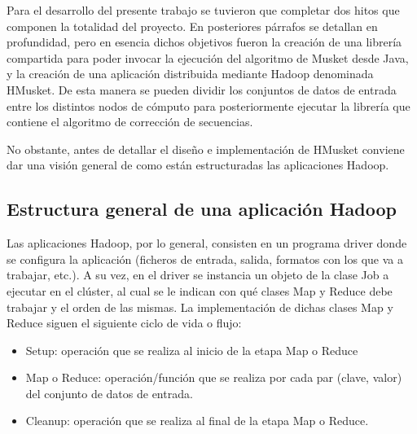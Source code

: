 \documentclass[conference]{IEEEtran}
\begin{document}
Para el desarrollo del presente trabajo se tuvieron que completar dos hitos que componen la totalidad del proyecto. En posteriores párrafos se detallan en profundidad, pero en esencia dichos objetivos fueron la creación de una librería compartida para poder invocar la ejecución del algoritmo de Musket desde Java, y la creación de una aplicación distribuida mediante Hadoop denominada HMusket. De esta manera se pueden dividir los conjuntos de datos de entrada entre los distintos nodos de cómputo para posteriormente ejecutar la librería que contiene el algoritmo de corrección de secuencias.

No obstante, antes de detallar el diseño e implementación de HMusket conviene dar una visión general de como están estructuradas las aplicaciones Hadoop.

\subsection{Estructura general de una aplicación Hadoop}
Las aplicaciones Hadoop, por lo general, consisten en un programa driver donde se configura la aplicación (ficheros de entrada, salida, formatos con los que va a trabajar, etc.). A su vez, en el driver se instancia un objeto de la clase Job a ejecutar en el clúster, al cual se le indican con qué clases Map y Reduce debe trabajar y el orden de las mismas. La implementación de dichas clases Map y Reduce siguen el siguiente ciclo de vida o flujo:

\begin{itemize}
	\item Setup: operación que se realiza al inicio de la etapa Map o Reduce
	\item Map o Reduce: operación/función que se realiza por cada par (clave, valor) del conjunto de datos de entrada.
	\item Cleanup: operación que se realiza al final de la etapa Map o Reduce.
\end{itemize}
\end{document}
